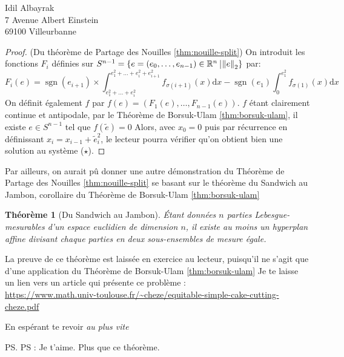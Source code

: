 \documentclass[french]{mpbmail}
\newtheorem{theorem}{Théorème}
\DeclareMathOperator{\sgn}{sgn}
\begin{document}
\begin{letter}{%
        Idil Albayrak\\
        7 Avenue Albert Einstein\\
        69100 Villeurbanne
        }
        \begin{proof}(Du théorème de Partage des Nouilles \ref*{thm:nouille-split})
            On introduit les fonctions $F_{i}$ définies sur $S^{n-1} = \left\{e = (e_{0}, \ldots, e_{n-1}) \in \mathbb{R}^{n}\ \vline \left\lVert e\right\rVert _{2} \right\}$ par:
            \begin{equation*}
                F_{i}(e) = \sgn(e_{i+1})\times \int_{e_{1}^{2} + \dots + e_{i}^{2}}^{e_{1}^{2} + \dots + e_{i}^{2} + e_{i+1}^{2}} f_{\sigma(i+1)}(x) \mathrm{d}x - \sgn(e_{1})\int_{0}^{e_{1}^{2}}f_{\sigma(1)}(x) \mathrm{d}x
            \end{equation*}
            On définit également $f$ par $f(e) = (F_{1}(e), \ldots, F_{n-1}(e))$.
            $f$ étant clairement continue et antipodale, par le Théorème de Borsuk-Ulam \ref*{thm:borsuk-ulam}, il existe $e \in S^{n-1}$ tel que $f(\tilde{e} ) = 0$
            Alors, avec $x_{0} = 0$ puis par récurrence en définissant $x_{i} = x_{i-1} + \tilde{e}_{i}^{2}$, le lecteur pourra vérifier qu'on obtient bien une solution au système ($\star$).
        \end{proof}
 
        Par ailleurs, on aurait pû donner une autre démonstration du Théorème de Partage des Nouilles \ref*{thm:nouille-split} se basant sur le théorème du Sandwich au Jambon, corollaire du Théorème de Borsuk-Ulam \ref*{thm:borsuk-ulam}                      
        
        \begin{theorem}[Du Sandwich au Jambon]
            Étant données $n$ parties \textit{Lebesgue}-mesurables d'un espace euclidien de dimension $n$, il existe au moins un hyperplan affine divisant chaque parties en deux sous-ensembles de mesure égale.
        \end{theorem}

        La preuve de ce théorème est laissée en exercice au lecteur, puisqu'il ne s'agit que d'une application du Théorème de Borsuk-Ulam \ref*{thm:borsuk-ulam}
        Je te laisse un lien vers un article qui présente ce problème : \\
        \url{https://www.math.univ-toulouse.fr/~cheze/equitable-simple-cake-cutting-cheze.pdf}

        \closing{En espérant te revoir \textsl{au plus vite}}
        \ps PS : Je t'aime. Plus que ce théorème.
    \end{letter}
\end{document}

